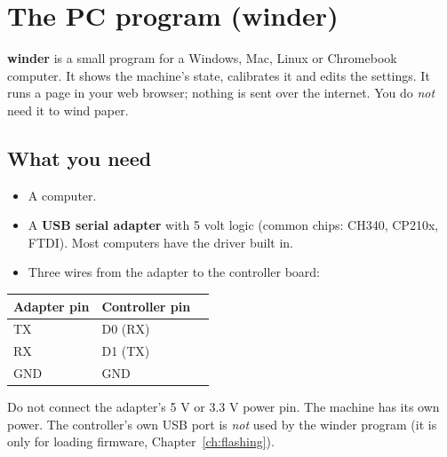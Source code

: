 \chapter{The PC program (winder)}\label{ch:pc}

\textbf{winder} is a small program for a Windows, Mac, Linux or Chromebook
computer. It shows the machine's state, calibrates it and edits the
settings. It runs a page in your web browser; nothing is sent over the
internet. You do \emph{not} need it to wind paper.

\section{What you need}\label{sec:adapter}
\begin{itemize}
  \item A computer.
  \item A \textbf{USB serial adapter} with 5 volt logic (common chips: CH340,
        CP210x, FTDI). Most computers have the driver built in.
  \item Three wires from the adapter to the controller board:
\end{itemize}
\begin{center}
\begin{tabular}{@{}lll@{}}
\toprule
\textbf{Adapter pin} & \textbf{Controller pin} & \\
\midrule
TX  & D0 (RX) & \\
RX  & D1 (TX) & \\
GND & GND & \\
\bottomrule
\end{tabular}
\end{center}
\begin{warning}
Do not connect the adapter's 5 V or 3.3 V power pin. The machine has its own
power. The controller's own USB port is \emph{not} used by the winder program
(it is only for loading firmware, Chapter~\ref{ch:flashing}).
\end{warning}

